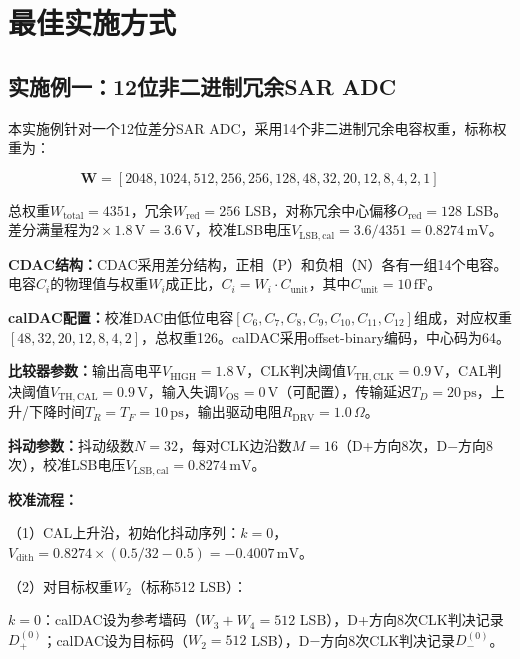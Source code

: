\documentclass[UTF8,a4paper,11pt]{ctexart}
\begin{document}
\section{最佳实施方式}

\subsection{实施例一：12位非二进制冗余SAR ADC}

本实施例针对一个12位差分SAR ADC，采用14个非二进制冗余电容权重，标称权重为：

\begin{equation}
\mathbf{W} = [2048, 1024, 512, 256, 256, 128, 48, 32, 20, 12, 8, 4, 2, 1]
\end{equation}

总权重$W_{\mathrm{total}} = 4351$，冗余$W_{\mathrm{red}} = 256$ LSB，对称冗余中心偏移$O_{\mathrm{red}} = 128$ LSB。差分满量程为$2 \times 1.8\,\mathrm{V} = 3.6\,\mathrm{V}$，校准LSB电压$V_{\mathrm{LSB,cal}} = 3.6/4351 = 0.8274\,\mathrm{mV}$。

\textbf{CDAC结构：}CDAC采用差分结构，正相（P）和负相（N）各有一组14个电容。电容$C_i$的物理值与权重$W_i$成正比，$C_i = W_i \cdot C_{\mathrm{unit}}$，其中$C_{\mathrm{unit}} = 10\,\mathrm{fF}$。

\textbf{calDAC配置：}校准DAC由低位电容$[C_6, C_7, C_8, C_9, C_{10}, C_{11}, C_{12}]$组成，对应权重$[48, 32, 20, 12, 8, 4, 2]$，总权重126。calDAC采用offset-binary编码，中心码为64。

\textbf{比较器参数：}输出高电平$V_{\mathrm{HIGH}} = 1.8\,\mathrm{V}$，CLK判决阈值$V_{\mathrm{TH,CLK}} = 0.9\,\mathrm{V}$，CAL判决阈值$V_{\mathrm{TH,CAL}} = 0.9\,\mathrm{V}$，输入失调$V_{\mathrm{OS}} = 0\,\mathrm{V}$（可配置），传输延迟$T_D = 20\,\mathrm{ps}$，上升/下降时间$T_R = T_F = 10\,\mathrm{ps}$，输出驱动电阻$R_{\mathrm{DRV}} = 1.0\,\Omega$。

\textbf{抖动参数：}抖动级数$N = 32$，每对CLK边沿数$M = 16$（D+方向8次，D$-$方向8次），校准LSB电压$V_{\mathrm{LSB,cal}} = 0.8274\,\mathrm{mV}$。

\textbf{校准流程：}

（1）CAL上升沿，初始化抖动序列：$k=0$，$V_{\mathrm{dith}} = 0.8274 \times (0.5/32 - 0.5) = -0.4007\,\mathrm{mV}$。

（2）对目标权重$W_2$（标称512 LSB）：

$k=0$：calDAC设为参考墙码（$W_3 + W_4 = 512$ LSB），D+方向8次CLK判决记录$D_+^{(0)}$；calDAC设为目标码（$W_2 = 512$ LSB），D$-$方向8次CLK判决记录$D_-^{(0)}$。
\end{document}
